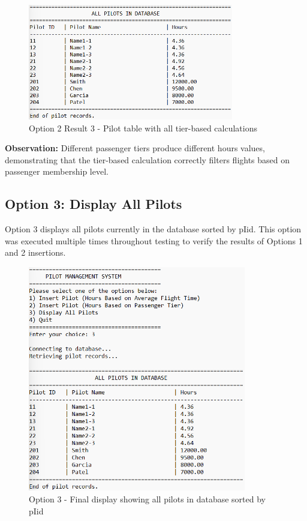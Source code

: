 \documentclass[12pt]{article}
\begin{document}
\begin{figure}[h]
\centering
\includegraphics[width=0.8\textwidth]{../../../Screenshots/Problem1/Option2/Option2-3_result.png}
\caption{Option 2 Result 3 - Pilot table with all tier-based calculations}
\label{fig:option2_result3}
\end{figure}

\textbf{Observation:} Different passenger tiers produce different hours values, demonstrating that the tier-based calculation correctly filters flights based on passenger membership level.

\newpage
\subsection{Option 3: Display All Pilots}

Option 3 displays all pilots currently in the database sorted by pIid. This option was executed multiple times throughout testing to verify the results of Options 1 and 2 insertions.

\begin{figure}[h]
\centering
\includegraphics[width=0.85\textwidth]{../../../Screenshots/Problem1/Other/Option3_final.png}
\caption{Option 3 - Final display showing all pilots in database sorted by pIid}
\label{fig:option3_final}
\end{figure}
\end{document}
